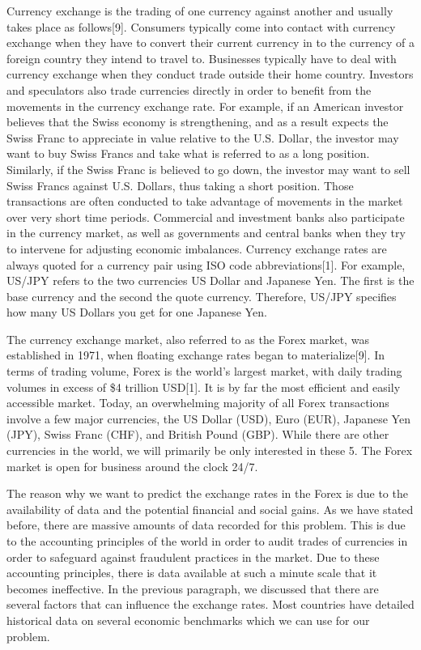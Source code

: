 \documentclass[twoside]{article}
\begin{document}
Currency exchange is the trading of one currency against another and usually takes place as follows[9]. Consumers typically come into contact with currency exchange when they have to convert their current currency in to the currency of a foreign country they intend to travel to. Businesses typically have to deal with currency exchange when they conduct trade outside their home country. Investors and speculators also trade currencies directly in order to benefit from the movements in the currency exchange rate. For example, if an American investor believes that the Swiss economy is strengthening, and as a result expects the Swiss Franc to appreciate in value relative to the U.S. Dollar, the investor may want to buy Swiss Francs and take what is referred to as a long position. Similarly, if the Swiss Franc is believed to go down, the investor may want to sell Swiss Francs against U.S. Dollars, thus taking a short position. Those transactions are often conducted to take advantage of movements in the market over very short time periods. Commercial and investment banks also participate in the currency market, as well as governments and central banks when they try to intervene for adjusting economic imbalances. Currency exchange rates are always quoted for a currency pair using ISO code abbreviations[1]. For example, US/JPY refers to the two currencies US Dollar and Japanese Yen. The first is the base currency and the second the quote currency. Therefore, US/JPY specifies how many US Dollars you get for one Japanese Yen.

The currency exchange market, also referred to as the Forex market, was established in 1971, when floating exchange rates began to materialize[9]. In terms of trading volume, Forex is the world’s largest market, with daily trading volumes in excess of \$4 trillion USD[1]. It is by far the most efficient and easily accessible market. Today, an overwhelming majority of all Forex transactions involve a few major currencies, the US Dollar (USD), Euro (EUR), Japanese Yen (JPY), Swiss Franc (CHF), and British Pound (GBP). While there are other currencies in the world, we will primarily be only interested in these 5. The Forex market is open for business around the clock 24/7.

The reason why we want to predict the exchange rates in the Forex is due to the availability of data and the potential financial and social gains. As we have stated before, there are massive amounts of data recorded for this problem. This is due to the accounting principles of the world in order to audit trades of currencies in order to safeguard against fraudulent practices in the market. Due to these accounting principles, there is data available at such a minute scale that it becomes ineffective. In the previous paragraph, we discussed that there are several factors that can influence the exchange rates. Most countries have detailed historical data on several economic benchmarks which we can use for our problem.
\end{document}
